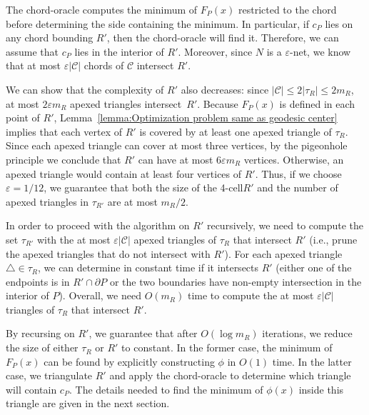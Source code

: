 \documentclass[a4paper,UKenglish]{lipics}
\newcommand{\F}[2]{\ensuremath{F_{\scriptscriptstyle #1}(#2)}}
\newcommand{\cp}{\ensuremath{c_P}}
\newcommand{\m}{\ensuremath{m_{\scriptscriptstyle R}}}
\newcommand{\reg}{\ensuremath{R'}}
\newcommand{\tcell}{4-cell\xspace}
\begin{document}
The chord-oracle computes the minimum of $\F{P}{x}$ restricted to the chord before determining the side containing the minimum. In particular, if $\cp$ lies on any chord bounding $\reg$, then the chord-oracle will find it. 
Therefore, we can assume that $\cp$ lies in the interior of $\reg$. Moreover, since $N$ is a $\varepsilon$-net, we know that at most $\varepsilon |\mathcal C|$ chords of $\mathcal C$ intersect $\reg$.

We can show that the complexity of $\reg$ also decreases: since $|\mathcal C| \leq 2|\tau_R| \leq 2\m$, at most $2\varepsilon \m$ apexed triangles intersect~$\reg$. Because $\F{P}{x}$ is defined in each point of $R'$, Lemma~\ref{lemma:Optimization problem same as geodesic center} implies that each vertex of $\reg$ is covered by at least one apexed triangle of $\tau_R$. 
Since each apexed triangle can cover at most three vertices, 
by the pigeonhole principle we conclude that $\reg$ can have at most $6 \varepsilon \m$ vertices. Otherwise, an apexed triangle would contain at least four vertices of $\reg$.
Thus, if we choose $\varepsilon = 1/12$, we guarantee that both the size of the \tcell $\reg$ and the number of apexed triangles in $\tau_{\reg}$ are at most $\m/2$. 


In order to proceed with the algorithm on  $\reg$ recursively, we need to compute the set $\tau_{\reg}$ with the at most $\varepsilon |\mathcal C|$ apexed triangles of $\tau_R$ that intersect $\reg$ (i.e., prune the apexed triangles that do not intersect with $\reg$). For each apexed triangle $\triangle\in \tau_R$, we can determine in constant time if it intersects $\reg$ (either one of the endpoints is in $\reg\cap \partial P$ or the two boundaries have non-empty intersection in the interior of $P$). 
Overall, we need $O(\m)$ time to compute the at most $\varepsilon |\mathcal C|$ triangles of $\tau_R$ that intersect $\reg$.

By recursing on $\reg$, we guarantee that after $O(\log \m)$ iterations, we reduce the size of either $\tau_R$ or $\reg$ to constant. 
In the former case, the minimum of $\F{P}{x}$ can be found by explicitly constructing $\phi$ in $O(1)$ time. 
In the latter case, we triangulate $\reg$ and apply the chord-oracle to determine which triangle will contain $\cp$. 
The details needed to find the minimum of $\phi(x)$ inside this triangle are given in the next section.
\end{document}
